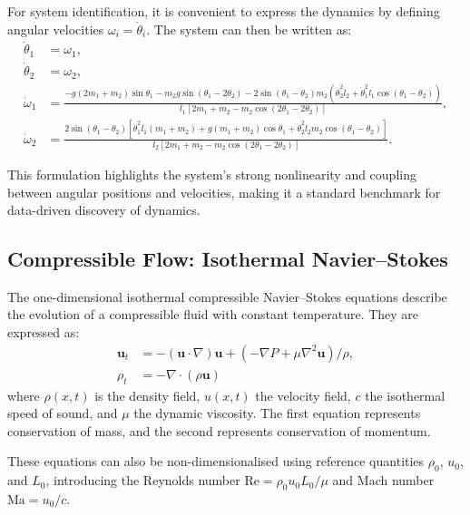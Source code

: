 For system identification, it is convenient to express the dynamics by defining angular velocities $\omega_i = \dot{\theta}_i$. The system can then be written as:
\begin{equation}
\begin{aligned}
\dot{\theta}_1 &= \omega_1, \\
\dot{\theta}_2 &= \omega_2, \\
\dot{\omega}_1 &= \frac{
    -g(2m_1 + m_2)\sin\theta_1 - m_2 g \sin(\theta_1 - 2\theta_2)
    - 2 \sin(\theta_1 - \theta_2) m_2 \left(
        \dot{\theta}_2^2 l_2 + \dot{\theta}_1^2 l_1 \cos(\theta_1 - \theta_2)
    \right)
}{
    l_1 \left[ 2m_1 + m_2 - m_2 \cos(2\theta_1 - 2\theta_2) \right]
}, \\
\dot{\omega}_2 &= \frac{
    2 \sin(\theta_1 - \theta_2)
    \left[
        \dot{\theta}_1^2 l_1 (m_1 + m_2)
        + g (m_1 + m_2) \cos\theta_1
        + \dot{\theta}_2^2 l_2 m_2 \cos(\theta_1 - \theta_2)
    \right]
}{
    l_2 \left[ 2m_1 + m_2 - m_2 \cos(2\theta_1 - 2\theta_2) \right]
}.
\end{aligned}
\label{eq:double_pendulum_first_order}
\end{equation}

This formulation highlights the system’s strong nonlinearity and coupling between angular positions and velocities, making it a standard benchmark for data-driven discovery of dynamics.
\subsection{Compressible Flow: Isothermal Navier–Stokes}

The one-dimensional isothermal compressible Navier–Stokes equations describe the evolution of a compressible fluid with constant temperature. They are expressed as:
\begin{equation}
\begin{aligned}
\mathbf{u}_t&=-(\mathbf{u} \cdot \nabla) \mathbf{u}+\left(-\nabla P+\mu \nabla^2 \mathbf{u}\right) / \rho, 
\\ \rho_t&=-\nabla \cdot(\rho \mathbf{u})
\end{aligned}
\end{equation}
where $\rho(x,t)$ is the density field, $u(x,t)$ the velocity field, $c$ the isothermal speed of sound, and $\mu$ the dynamic viscosity. The first equation represents conservation of mass, and the second represents conservation of momentum.

These equations can also be non-dimensionalised using reference quantities $\rho_0$, $u_0$, and $L_0$, introducing the Reynolds number $\mathrm{Re} = \rho_0 u_0 L_0 / \mu$ and Mach number $\mathrm{Ma} = u_0 / c$.
